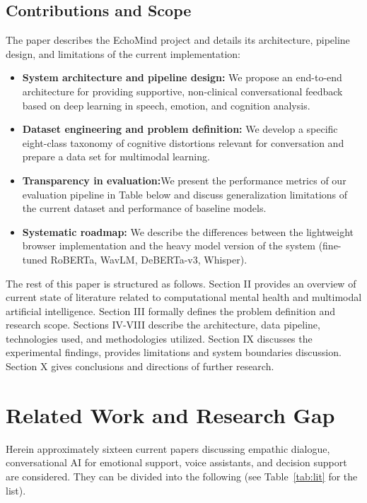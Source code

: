 \documentclass[conference]{IEEEtran}
\begin{document}
\subsection{Contributions and Scope}
The paper describes the EchoMind project and details its architecture, pipeline design, and limitations of the current implementation:
\begin{itemize}
\item \textbf{System architecture and pipeline design:} We propose an end-to-end architecture for providing supportive, non-clinical conversational feedback based on deep learning in speech, emotion, and cognition analysis.
\item \textbf{Dataset engineering and problem definition:} We develop a specific eight-class taxonomy of cognitive distortions relevant for conversation and prepare a data set for multimodal learning.
\item \textbf{Transparency in evaluation:}We present the performance metrics of our evaluation pipeline in Table below and discuss generalization limitations of the current dataset and performance of baseline models.
\item \textbf{Systematic roadmap:} We describe the differences between the lightweight browser implementation and the heavy model version of the system (fine-tuned RoBERTa, WavLM, DeBERTa-v3, Whisper).
\end{itemize}

The rest of this paper is structured as follows. Section II provides an overview of current state of literature related to computational mental health and multimodal artificial intelligence. Section III formally defines the problem definition and research scope. Sections IV-VIII describe the architecture, data pipeline, technologies used, and methodologies utilized. Section IX discusses the experimental findings, provides limitations and system boundaries discussion. Section X gives conclusions and directions of further research.

\section{Related Work and Research Gap}
Herein approximately sixteen current papers discussing empathic dialogue, conversational AI for emotional support, voice assistants, and decision support are considered. They can be divided into the following (see Table~\ref{tab:lit} for the list).
\end{document}
